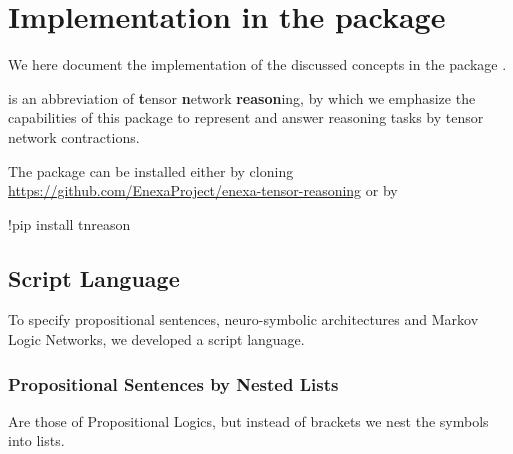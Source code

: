 \section{Implementation in the \tnreason package}

We here document the implementation of the discussed concepts in the \python package \tnreason.
 
\tnreason is an abbreviation of \textbf{t}ensor \textbf{n}etwork \textbf{reason}ing, by which we emphasize the capabilities of this package to represent and answer reasoning tasks by tensor network contractions. 

The package can be installed either by cloning \href{https://github.com/EnexaProject/enexa-tensor-reasoning}{https://github.com/EnexaProject/enexa-tensor-reasoning} or by
\begin{centeredcode}
	!pip install tnreason
\end{centeredcode}


\subsection{Script Language}\label{subsec:scriptLanguage}

To specify propositional sentences, neuro-symbolic architectures and Markov Logic Networks, we developed a script language.

\subsubsection{Propositional Sentences by Nested Lists}

Are those of Propositional Logics, but instead of brackets we nest the symbols into lists.


